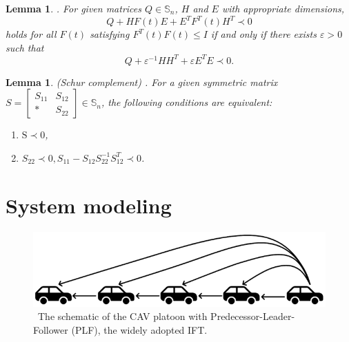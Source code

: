 \documentclass[a4paper]{cas-sc}
\newtheorem{lemma}[theorem]{Lemma}
\begin{document}
\begin{lemma}
  \label{lemmaX1}
  \citep{petersen1986riccati}. For given matrices $Q\in\mathbb{S}_n$, $H$ and $E$ with appropriate dimensions,
  \begin{equation*}
    Q + HF(t)E + {E^{T}}{F^{T}}(t){H^{T}} \prec 0
  \end{equation*}
  holds for all $F(t)$ satisfying $F^T(t)F(t)\le I$ if and only if there exists $\varepsilon>0$ such that
  \begin{equation*}
    Q + {\varepsilon ^{ - 1}}H{H^{T}} + \varepsilon {E^{T}}E \prec 0.
  \end{equation*}
\end{lemma}

\begin{lemma}
  \label{lemmaX2}
  (Schur complement) \citep{boyd1994linear}. For a given symmetric matrix $S = \left[ {\begin{array}{*{20}{l}}
            {{S_{11}}} & {{S_{12}}} \\
            *          & {{S_{22}}}
          \end{array}} \right] \in \mathbb{S}{_n}$, the following conditions are equivalent:
  \begin{enumerate}
    \item ${\text{S}} \prec 0$,
    \item ${S_{22}} \prec 0,{S_{11}} - {S_{12}}S_{22}^{ - 1}S_{12}^{T} \prec 0$.
  \end{enumerate}
\end{lemma}


\section{System modeling}
\label{Section 3}

\begin{figure}
  \centering

  \includegraphics[width=12cm]{figs/fig1.png}
  \caption{~The schematic of the CAV platoon with Predecessor-Leader-Follower (PLF), the widely adopted IFT.}
  \label{fig1}
\end{figure}
\end{document}
